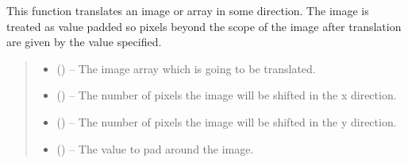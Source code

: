 \documentclass[letterpaper,11pt,english]{sphinxmanual}
\begin{document}

\begin{savenotes}\begin{fulllineitems}
\label{\detokenize{code/opihiexarata.library.image:opihiexarata.library.image.translate_image_array}}
\pysigstartsignatures
{}
\pysigstopsignatures
\sphinxAtStartPar
This function translates an image or array in some direction. The image
is treated as value padded so pixels beyond the scope of the image after
translation are given by the value specified.
\begin{quote}\begin{description}
\begin{itemize}
\item {} 
\sphinxAtStartPar
{} () – The image array which is going to be translated.

\item {} 
\sphinxAtStartPar
{} (\sphinxstyleliteralemphasis{\sphinxupquote{, }}) – The number of pixels the image will be shifted in the x direction.

\item {} 
\sphinxAtStartPar
{} (\sphinxstyleliteralemphasis{\sphinxupquote{, }}) – The number of pixels the image will be shifted in the y direction.

\item {} 
\sphinxAtStartPar
{} (\sphinxstyleliteralemphasis{\sphinxupquote{, }}) – The value to pad around the image.


\end{itemize}
\end{description}
\end{quote}
\end{fulllineitems}
\end{savenotes}
\end{document}
